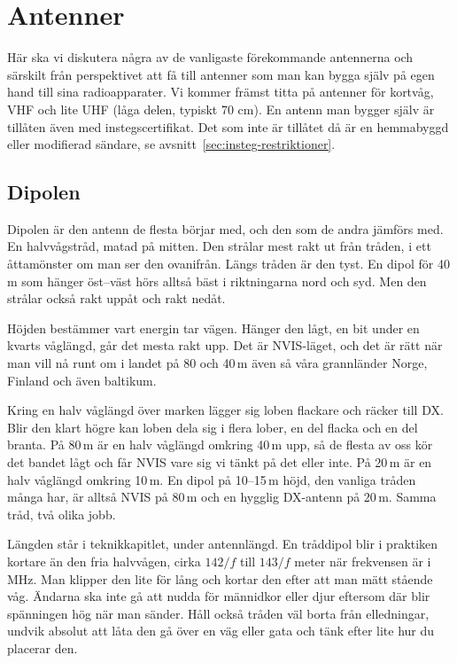
\section{Antenner}
\label{sec:antenner}

Här ska vi diskutera några av de vanligaste förekommande antennerna
och särskilt från perspektivet att få till antenner som man kan bygga
själv på egen hand till sina radioapparater. Vi kommer främst titta på
antenner för kortvåg, VHF och lite UHF (låga delen, typiskt 70 cm).
En antenn man bygger själv är tillåten även med instegscertifikat.
Det som inte är tillåtet då är en hemmabyggd eller modifierad sändare,
se avsnitt~\ref{sec:insteg-restriktioner}.

\subsection{Dipolen}

Dipolen är den antenn de flesta börjar med, och den som de andra
jämförs med. En halvvågstråd, matad på mitten. Den strålar mest rakt
ut från tråden, i ett åttamönster om man ser den ovanifrån. Längs
tråden är den tyst. En dipol för 40\,m som hänger öst--väst hörs
alltså bäst i riktningarna nord och syd. Men den strålar också rakt
uppåt och rakt nedåt.

Höjden bestämmer vart energin tar vägen. Hänger den lågt, en bit under
en kvarts våglängd, går det mesta rakt upp. Det är NVIS-läget, och det
är rätt när man vill nå runt om i landet på 80 och 40\,m även så våra
grannländer Norge, Finland och även baltikum.

Kring en halv våglängd över marken lägger sig loben flackare och
räcker till DX. Blir den klart högre kan loben dela sig i flera lober,
en del flacka och en del branta. På 80\,m är en halv våglängd omkring
40\,m upp, så de flesta av oss kör det bandet lågt och får NVIS vare
sig vi tänkt på det eller inte. På 20\,m är en halv våglängd omkring
10\,m. En dipol på 10--15\,m höjd, den vanliga tråden många har, är
alltså NVIS på 80\,m och en hygglig DX-antenn på 20\,m. Samma tråd,
två olika jobb.

Längden står i teknikkapitlet, under antennlängd. En tråddipol blir i
praktiken kortare än den fria halvvågen, cirka $142/f$ till $143/f$
meter när frekvensen är i MHz. Man klipper den lite för lång och
kortar den efter att man mätt stående våg. Ändarna ska inte gå att
nudda för männidkor eller djur eftersom där blir spänningen hög när
man sänder. Håll också tråden väl borta från elledningar, undvik
absolut att låta den gå över en väg eller gata och tänk efter lite hur
du placerar den.

